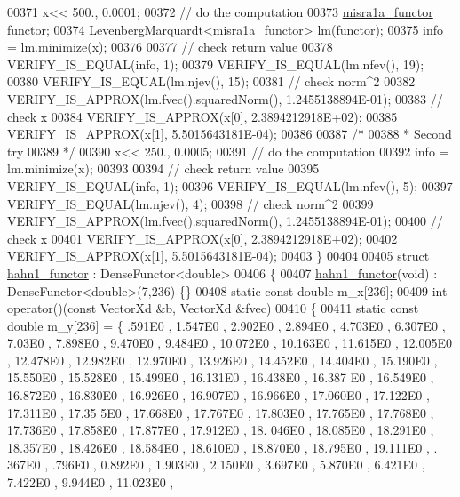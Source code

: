 \begin{DoxyCode}
00371   x<< 500., 0.0001;
00372   \textcolor{comment}{// do the computation}
00373   \hyperlink{structmisra1a__functor}{misra1a\_functor} functor;
00374   LevenbergMarquardt<misra1a\_functor> lm(functor);
00375   info = lm.minimize(x);
00376 
00377   \textcolor{comment}{// check return value}
00378   VERIFY\_IS\_EQUAL(info, 1);
00379   VERIFY\_IS\_EQUAL(lm.nfev(), 19);
00380   VERIFY\_IS\_EQUAL(lm.njev(), 15);
00381   \textcolor{comment}{// check norm^2}
00382   VERIFY\_IS\_APPROX(lm.fvec().squaredNorm(), 1.2455138894E-01);
00383   \textcolor{comment}{// check x}
00384   VERIFY\_IS\_APPROX(x[0], 2.3894212918E+02);
00385   VERIFY\_IS\_APPROX(x[1], 5.5015643181E-04);
00386 
00387   \textcolor{comment}{/*}
00388 \textcolor{comment}{   * Second try}
00389 \textcolor{comment}{   */}
00390   x<< 250., 0.0005;
00391   \textcolor{comment}{// do the computation}
00392   info = lm.minimize(x);
00393 
00394   \textcolor{comment}{// check return value}
00395   VERIFY\_IS\_EQUAL(info, 1);
00396   VERIFY\_IS\_EQUAL(lm.nfev(), 5);
00397   VERIFY\_IS\_EQUAL(lm.njev(), 4);
00398   \textcolor{comment}{// check norm^2}
00399   VERIFY\_IS\_APPROX(lm.fvec().squaredNorm(), 1.2455138894E-01);
00400   \textcolor{comment}{// check x}
00401   VERIFY\_IS\_APPROX(x[0], 2.3894212918E+02);
00402   VERIFY\_IS\_APPROX(x[1], 5.5015643181E-04);
00403 \}
00404 
00405 \textcolor{keyword}{struct }\hyperlink{structhahn1__functor}{hahn1\_functor} : DenseFunctor<double>
00406 \{
00407     \hyperlink{structhahn1__functor}{hahn1\_functor}(\textcolor{keywordtype}{void}) : DenseFunctor<double>(7,236) \{\}
00408     \textcolor{keyword}{static} \textcolor{keyword}{const} \textcolor{keywordtype}{double} m\_x[236];
00409     \textcolor{keywordtype}{int} operator()(\textcolor{keyword}{const} VectorXd &b, VectorXd &fvec)
00410     \{
00411         \textcolor{keyword}{static} \textcolor{keyword}{const} \textcolor{keywordtype}{double} m\_y[236] = \{ .591E0 , 1.547E0 , 2.902E0 , 2.894E0 , 4.703E0 , 6.307E0 , 7.03E0 
       , 7.898E0 , 9.470E0 , 9.484E0 , 10.072E0 , 10.163E0 , 11.615E0 , 12.005E0 , 12.478E0 , 12.982E0 , 12.970E0 
      , 13.926E0 , 14.452E0 , 14.404E0 , 15.190E0 , 15.550E0 , 15.528E0 , 15.499E0 , 16.131E0 , 16.438E0 , 16.387
      E0 , 16.549E0 , 16.872E0 , 16.830E0 , 16.926E0 , 16.907E0 , 16.966E0 , 17.060E0 , 17.122E0 , 17.311E0 , 17.35
      5E0 , 17.668E0 , 17.767E0 , 17.803E0 , 17.765E0 , 17.768E0 , 17.736E0 , 17.858E0 , 17.877E0 , 17.912E0 , 18.
      046E0 , 18.085E0 , 18.291E0 , 18.357E0 , 18.426E0 , 18.584E0 , 18.610E0 , 18.870E0 , 18.795E0 , 19.111E0 , .
      367E0 , .796E0 , 0.892E0 , 1.903E0 , 2.150E0 , 3.697E0 , 5.870E0 , 6.421E0 , 7.422E0 , 9.944E0 , 11.023E0 , 

\end{DoxyCode}
